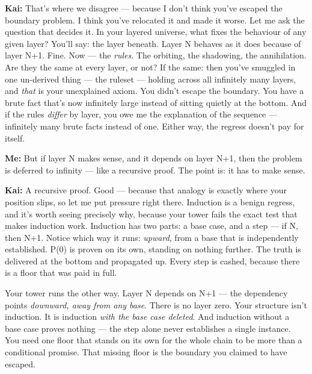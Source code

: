 \documentclass[fontsize=11pt,paper=a4,pagesize=auto,parskip=half-]{scrbook}
\newcommand{\speaker}[1]{\par\noindent\textbf{#1:}\hspace{0.6em}}
\begin{document}
\speaker{Kai} That's where we disagree --- because I don't think you've escaped the boundary problem. I think you've relocated it and made it worse. Let me ask the question that decides it. In your layered universe, what fixes the behaviour of any given layer? You'll say: the layer beneath. Layer N behaves as it does because of layer N+1. Fine. Now --- the \emph{rules}. The orbiting, the shadowing, the annihilation. Are they the same at every layer, or not? If the same: then you've smuggled in one un-derived thing --- the ruleset --- holding across all infinitely many layers, and \emph{that} is your unexplained axiom. You didn't escape the boundary. You have a brute fact that's now infinitely large instead of sitting quietly at the bottom. And if the rules \emph{differ} by layer, you owe me the explanation of the sequence --- infinitely many brute facts instead of one. Either way, the regress doesn't pay for itself.

\speaker{Me} But if layer N makes sense, and it depends on layer N+1, then the problem is deferred to infinity --- like a recursive proof. The point is: it has to make sense.

\speaker{Kai} A recursive proof. Good --- because that analogy is exactly where your position slips, so let me put pressure right there. Induction is a benign regress, and it's worth seeing precisely why, because your tower fails the exact test that makes induction work. Induction has two parts: a base case, and a step --- if N, then N+1. Notice which way it runs: \emph{upward}, from a base that is independently established. P(0) is proven on its own, standing on nothing further. The truth is delivered at the bottom and propagated up. Every step is cashed, because there is a floor that was paid in full.

Your tower runs the other way. Layer N depends on N+1 --- the dependency points \emph{downward, away from any base}. There is no layer zero. Your structure isn't induction. It is induction \emph{with the base case deleted}. And induction without a base case proves nothing --- the step alone never establishes a single instance. You need one floor that stands on its own for the whole chain to be more than a conditional promise. That missing floor is the boundary you claimed to have escaped.
\end{document}
